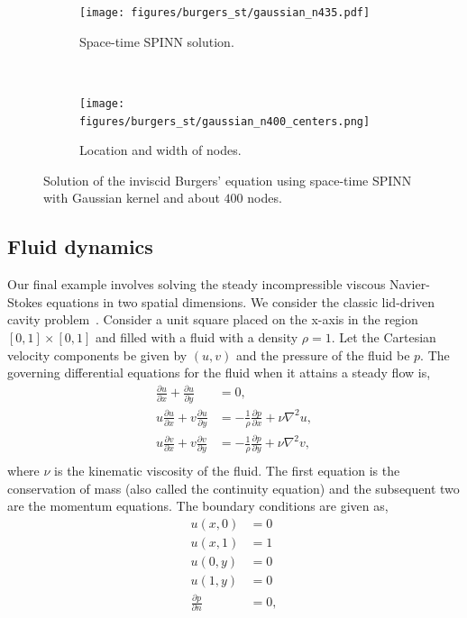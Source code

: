 \documentclass[12pt]{article}
\begin{document}
\begin{figure}
\centering
\begin{subfigure}{0.45\textwidth}
\texttt{[image: figures/burgers\_st/gaussian\_n435.pdf]}
\caption{Space-time SPINN solution.}
\label{fig:spinn_burgers_a}
\end{subfigure}
~
\begin{subfigure}{0.5\textwidth}
\texttt{[image: figures/burgers\_st/gaussian\_n400\_centers.png]}
\caption{Location and width of nodes.}
\label{fig:spinn_burgers_b}
\end{subfigure}
\caption{Solution of the inviscid Burgers' equation using space-time SPINN with Gaussian kernel and about $400$ nodes.}
\label{fig:spinn_burgers}
\end{figure}

\subsection{Fluid dynamics}
Our final example involves solving the steady incompressible viscous Navier-Stokes equations in two spatial dimensions. We consider the classic lid-driven cavity problem~\cite{ldc:ghia}. Consider a unit square placed on the x-axis in the region $[0, 1] \times [0, 1]$ and filled with a fluid with a density $\rho=1$.   Let the Cartesian velocity components be given by $(u, v)$ and the pressure of the fluid be $p$.  The governing differential equations for the fluid when it attains a steady flow is,
\begin{displaymath}
\begin{split}
\frac{\partial u}{\partial x} + \frac{\partial u}{\partial y} &= 0, \\
u \frac{\partial u}{\partial x} + v \frac{\partial u}{\partial y} &= -\frac{1}{\rho} \frac{\partial p}{\partial x} + \nu \nabla^2 u,\\
u \frac{\partial v}{\partial x} + v \frac{\partial v}{\partial y} &= -\frac{1}{\rho} \frac{\partial p}{\partial y} + \nu \nabla^2 v,\\
\end{split}
\end{displaymath}
where $\nu$ is the kinematic viscosity of the fluid.  The first equation is the conservation of mass (also called the continuity equation) and the subsequent two are the momentum equations. The boundary conditions are given as,
\begin{displaymath}
\begin{split}
    u(x, 0) &= 0\\
    u(x, 1) &= 1\\
    u(0, y) &= 0 \\
    u(1, y) &= 0 \\
    \frac{\partial p}{\partial n} &= 0,
\end{split}
\end{displaymath}
\end{document}
